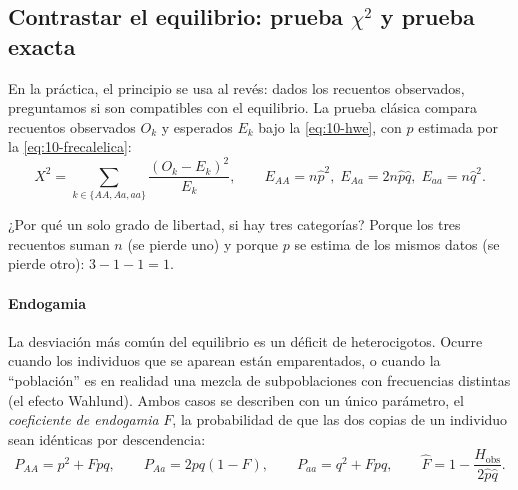 \subsection{Contrastar el equilibrio: prueba \texorpdfstring{$\chi^2$}{chi cuadrado} y prueba exacta}

En la práctica, el principio se usa al revés: dados los recuentos observados, preguntamos si son compatibles con el equilibrio. La prueba clásica compara recuentos observados $O_k$ y esperados $E_k$ bajo la \cref{eq:10-hwe}, con $p$ estimada por la \cref{eq:10-frecalelica}:
\begin{equation}\label{eq:10-chi2}
X^2 = \sum_{k\in\{AA,Aa,aa\}} \frac{(O_k-E_k)^2}{E_k}, \qquad E_{AA}=n\hat p^2,\; E_{Aa}=2n\hat p\hat q,\; E_{aa}=n\hat q^2 .
\end{equation}

\begin{simbolos}
\end{simbolos}

¿Por qué un solo grado de libertad, si hay tres categorías? Porque los tres recuentos suman $n$ (se pierde uno) y porque $p$ se estima de los mismos datos (se pierde otro): $3-1-1=1$.

\paragraph{Endogamia} La desviación más común del equilibrio es un déficit de heterocigotos. Ocurre cuando los individuos que se aparean están emparentados, o cuando la ``población'' es en realidad una mezcla de subpoblaciones con frecuencias distintas (el efecto Wahlund). Ambos casos se describen con un único parámetro, el \emph{coeficiente de endogamia} $F$, la probabilidad de que las dos copias de un individuo sean idénticas por descendencia:
\begin{equation}\label{eq:10-endogamia}
P_{AA}=p^2+Fpq,\qquad P_{Aa}=2pq(1-F),\qquad P_{aa}=q^2+Fpq,\qquad \hat F = 1-\frac{H_{\text{obs}}}{2\hat p\hat q}.
\end{equation}

\begin{simbolos}
\end{simbolos}

